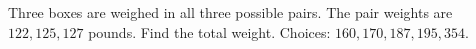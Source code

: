 Three boxes are weighed in all three possible pairs. The pair weights are $122,125,127$ pounds. Find the total weight. Choices: $160,170,187,195,354$.
